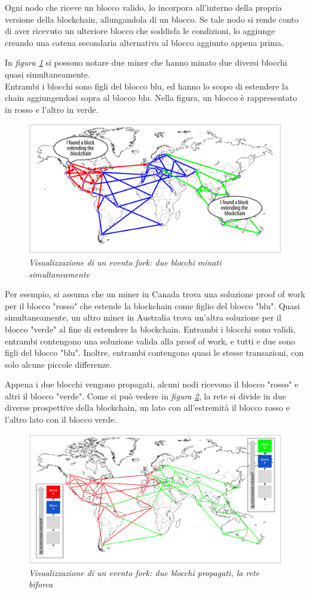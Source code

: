 Ogni nodo che riceve un blocco valido, lo incorpora all'interno della propria versione della blockchain, allungandola di un blocco. Se tale nodo si rende conto di aver ricevuto un ulteriore blocco che soddisfa le condizioni, lo aggiunge creando una catena secondaria alternativa al blocco aggiunto appena prima.

In \textit{figura \ref{fig:fork2}} si possono notare due miner che hanno minato due diversi blocchi quasi simultaneamente.\\
Entrambi i blocchi sono figli del blocco blu, ed hanno lo scopo di estendere la chain aggiungendosi sopra al blocco blu. Nella figura, un blocco è rappresentato in rosso e l'altro in verde.
\begin{figure}[htbp]
	\centering
	\includegraphics[width=0.85 \linewidth]{figure/fork2}
	\caption{\textit{Visualizzazione di un evento fork: due blocchi minati simultaneamente} \label{fig:fork2}}
\end{figure}

Per esempio, si assuma che un miner in Canada trova una soluzione proof of work per il blocco "rosso" che estende la blockchain come figlio del blocco "blu". Quasi simultaneamente, un altro miner in Australia trova un'altra soluzione per il blocco "verde" al fine di estendere la blockchain. Entrambi i blocchi sono validi, entrambi contengono una soluzione valida alla proof of work, e tutti e due sono figli del blocco "blu". Inoltre, entrambi contengono quasi le stesse transazioni, con solo alcune piccole differenze.

Appena i due blocchi vengono propagati, alcuni nodi ricevono il blocco "rosso" e altri il blocco "verde". Come si può vedere in \textit{figura \ref{fig:fork3}}, la rete si divide in due diverse prospettive della blockchain, un lato con all'estremità il blocco rosso e l'altro lato con il blocco verde.
\begin{figure}[htbp]
	\centering
	\includegraphics[width=0.85 \linewidth]{figure/fork3}
	\caption{\textit{Visualizzazione di un evento fork: due blocchi propagati, la rete biforca} \label{fig:fork3}}
\end{figure}

